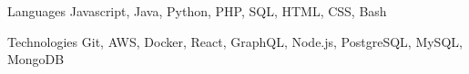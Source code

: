 \begin{cvskills}
  \cvskill
    {Languages} %
    {Javascript, Java, Python, PHP, SQL, HTML, CSS, Bash} %

  \cvskill
    {Technologies} %
    {Git, AWS, Docker, React, GraphQL, Node.js, PostgreSQL, MySQL, MongoDB} %
\end{cvskills}

